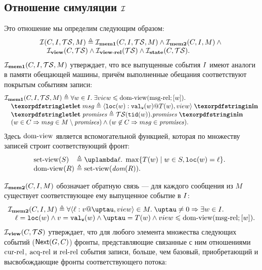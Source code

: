   \subsection{Отношение симуляции $\mathcal{I}$}
  Это отношение мы определим следующим образом:
  \[\inarr{
    \simRel(C, \IssuedSet, \TSf, M) \defeq \invMemOne(C, \IssuedSet, \TSf, M) \land  \invMemTwo(C, \IssuedSet, M) \land {} \\
    \quad \invView(C, \TSf) \land \invViewRel(\TSf) \land \invState(C, \TSf).
  }\]
  $\mathcal{I}_{\rm \bf mem1}(C, I, \mathcal{TS}, M)$ утверждает, что все выпущенные
  события $I$ имеют аналоги в памяти обещающей машины, причём выполненные обещания соответствуют покрытым
  событиям записи:
  \[\inarr{
  \invMemOne(C, \IssuedSet, \TSf, M) \defeq \forall w \in \IssuedSet. \; \exists \view \le \domView(\msgRel; [w]). \; \\
  \quad \letdef{msg}{\msg{\lLOC(w)}{\lVALW(w)}{T(w)}{\view}} \\
  \quad \letdef{\PromSet}{\TSf(\lTID(w)).\PromSet} \\
  \quad (w \in  C \implies msg \in M \setminus \PromSet) \land (w \nin C \implies msg \in \PromSet). \\
  }\]
  Здесь ${\rm dom\text{-}view}$ является вспомогательной функцией, которая по множеству записей строит соответствующий фронт:
  \[\begin{array}{@{}l@{~}l}
    \setView(S) & \defeq \lambda \loc. \; \max \{ T(w) \mid w \in S, \lLOC(w) = \loc\}. \\
    \domView(R) & \defeq \setView(\dom{R}). \\
  \end{array}\]
  
  $\mathcal{I}_{\rm \bf mem2}(C, I, M)$ обозначает обратную связь --- для каждого сообщения из $M$ существует
  соответствующее ему выпущенное событие в $I$:
  \[\inarr{
  \invMemTwo(C, \IssuedSet, M) \defeq \forall \msg{\loc}{\val}{\tau}{\view} \in M. \; \tau \neq 0 \Rightarrow
    \exists w \in \IssuedSet. \; \\
  \quad \loc = \lLOC(w) \land \val = \lVALW(w) \land \tau = T(w) \land \view \le \domView(\msgRel; [w]). \\
  }\]
  $\mathcal{I}_{\rm \bf view}(C, \mathcal{TS})$ утверждает, что для любого элемента множества следующих событий (${\sf Next}(G, C)$)
  фронты, представляющие связанные с ним отношениями ${\rm cur\text{-}rel}$, ${\rm acq\text{-}rel}$ и ${\rm rel\text{-}rel}$ события записи, больше, чем
  базовый, приобретающий и высвобождающие фронты соответствующего потока:


